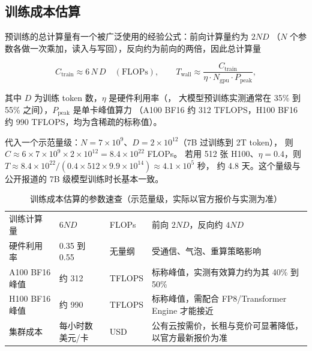 \subsection{训练成本估算}

预训练的总计算量有一个被广泛使用的经验公式：前向计算量约为 $2ND$
（$N$ 个参数各做一次乘加，读入与写回），反向约为前向的两倍，因此总计算量

\begin{equation}
C_{\text{train}} \approx 6 \, N \, D \quad (\text{FLOPs}), \qquad
T_{\text{wall}} \approx \frac{C_{\text{train}}}{\eta \cdot N_{\text{gpu}} \cdot P_{\text{peak}}} ,
\label{eq:train-flops}
\end{equation}

其中 $D$ 为训练 token 数，$\eta$ 是硬件利用率（，
大模型预训练实测通常在 35\% 到 55\% 之间），$P_{\text{peak}}$ 是单卡峰值算力
（A100 BF16 约 312 TFLOPS，H100 BF16 约 990 TFLOPS，均为含稀疏的标称值）。

代入一个示范量级：$N = 7 \times 10^9$、$D = 2 \times 10^{12}$（7B 过训练到 2T token），
则 $C \approx 6 \times 7\times10^9 \times 2\times10^{12} = 8.4 \times 10^{22}$ FLOPs。
若用 512 张 H100、$\eta = 0.4$，则
$T \approx 8.4\times10^{22} / (0.4 \times 512 \times 9.9\times10^{14}) \approx 4.1 \times 10^5$ 秒，
约 4.8 天。这个量级与公开报道的 7B 级模型训练时长基本一致。

\begin{table}[htbp]
\centering
\caption{训练成本估算的参数速查（示范量级，实际以官方报价与实测为准）}
\label{tab:train-cost}
\small
\begin{tabularx}{\textwidth}{L{2.4cm} L{2.3cm} L{2.2cm} Y}
\toprule
{} &  &  &  \\
\midrule
训练计算量 & $6ND$ & FLOPs & 前向 $2ND$，反向约 $4ND$ \\
\addlinespace
硬件利用率 & 0.35 到 0.55 & 无量纲 & 受通信、气泡、重算策略影响 \\
\addlinespace
A100 BF16 峰值 & 约 312 & TFLOPS & 标称峰值，实测有效算力约为其 40\% 到 50\% \\
\addlinespace
H100 BF16 峰值 & 约 990 & TFLOPS & 标称峰值，需配合 FP8/Transformer Engine 才能接近 \\
\addlinespace
集群成本 & 每小时数美元/卡 & USD & 公有云按需价，长租与竞价可显著降低，以官方最新报价为准 \\
\bottomrule
\end{tabularx}
\end{table}

